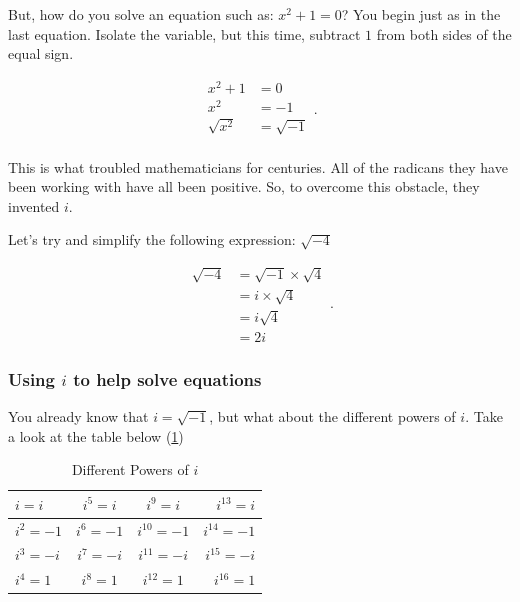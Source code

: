 But, how do you solve an equation such as: $x^{2} + 1 = 0$? You begin just as in
the last equation. Isolate the variable, but this time, subtract $1$ from both
sides of the equal sign.

\begin{equation}
  \label{eqt:history_of_the_imaginary_numbers_2}
  \begin{split}
    x^{2} + 1 &= 0 \\
    x^{2} &= -1 \\
    \sqrt{x^{2}} &= \sqrt{-1} \\
  \end{split}
.\end{equation}

This is what troubled mathematicians for centuries. All of the radicans they
have been working with have all been positive. So, to overcome this obstacle,
they invented $i$.

\begin{example}
  \label{exm:history_of_the_imaginary_numbers_3}

  Let's try and simplify the following expression: $\sqrt{-4}$
  
  \begin{equation}
    \label{eqt:history_of_the_imaginary_numbers_4}
    \begin{split}
      \sqrt{-4} &= \sqrt{-1} \times \sqrt{4} \\
            &= i \times \sqrt{4} \\
            &= i\sqrt{4} \\
            &= \boxed{2i}
    \end{split}
  .\end{equation}
\end{example}


\subsubsection{Using $i$ to help solve equations}
\label{sub_sub_sec:using_i_to_help_solve_equations}

You already know that $i = \sqrt{-1}$, but what about the different powers of
$i$. Take a look at the table below (\ref{tab:different_powers_of_i})

\begin{table}[h]
  \centering
  \caption{Different Powers of $i$}
  \label{tab:different_powers_of_i}

  \begin{tabular}{|l|c|c|r|}
    \hline
    $i = i$ & $i^{5} = i$ & $i^{9} = i$ & $i^{13} = i$ \\ \hline
    $i^{2} = -1$ & $i^{6} = -1$ & $i^{10} = -1$ & $i^{14} = -1$ \\ \hline
    $i^{3} = -i$ & $i^{7} = -i$ & $i^{11} = -i$ & $i^{15} = -i$ \\ \hline
    $i^{4} = 1$ & $i^{8} = 1$ & $i^{12} = 1$ & $i^{16} = 1$ \\ \hline
  \end{tabular}
\end{table}

